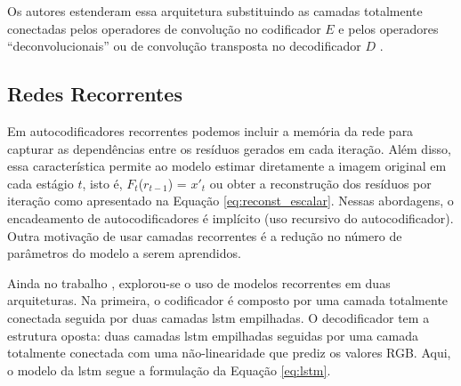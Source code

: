 Os autores estenderam essa arquitetura substituindo as camadas totalmente conectadas pelos operadores de convolução no codificador $E$ e pelos operadores ``deconvolucionais'' ou de convolução transposta no decodificador $D$ \cite{Variable2016Toderici}.




\subsection{Redes Recorrentes}



Em autocodificadores recorrentes podemos incluir a memória da rede para capturar as dependências entre os resíduos gerados em cada iteração. Além disso, essa característica permite ao modelo  estimar diretamente a imagem original em cada estágio $t$, isto é, $F_t$($r_{t-1}$) = $x'_{t}$ ou obter a reconstrução dos resíduos por iteração como apresentado na Equação \ref{eq:reconst_escalar}. 
Nessas abordagens, o encadeamento de autocodificadores é implícito (uso recursivo do autocodificador). Outra motivação de usar camadas recorrentes é a redução no número de parâmetros do modelo a serem aprendidos. 

Ainda no trabalho \cite{Variable2016Toderici}, explorou-se o uso de modelos recorrentes em duas arquiteturas. Na primeira, o codificador é composto por uma camada totalmente conectada seguida por duas camadas \acrshort{lstm} empilhadas. O decodificador tem a estrutura oposta: duas camadas \acrshort{lstm} empilhadas seguidas por uma camada totalmente conectada com uma não-linearidade que prediz os valores RGB. Aqui, o modelo da \acrshort{lstm} segue a formulação da Equação \ref{eq:lstm}.

